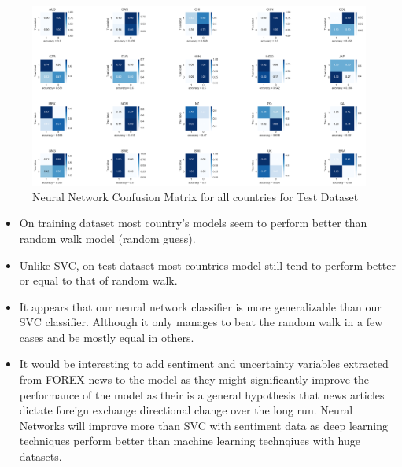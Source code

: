 \documentclass{article}
\begin{document}
\begin{figure}[H]
    \centering
    \hspace*{-1.25in}
    \includegraphics[scale = .30]{images/direction/n_cm_test.png}
    \caption{Neural Network Confusion Matrix for all countries for Test Dataset}
    \label{simulationfigure}
\end{figure}

\begin{itemize}
  \item On training dataset most country's models seem to perform better than random walk model (random guess).
  \item Unlike SVC, on test dataset most countries model still tend to perform better or equal to that of random walk.
  \item It appears that our neural network classifier is more generalizable than our SVC classifier. Although it only manages to beat the random walk in a few cases and be mostly
        equal in others.
  \item It would be interesting to add sentiment and uncertainty variables extracted from FOREX news to the model as they might significantly improve the performance
        of the model as their is a general hypothesis that news articles dictate foreign exchange directional change over the long run. Neural Networks will improve more
        than SVC with sentiment data as deep learning techniques perform better than machine learning technqiues with huge datasets.
\end{itemize}
\end{document}
